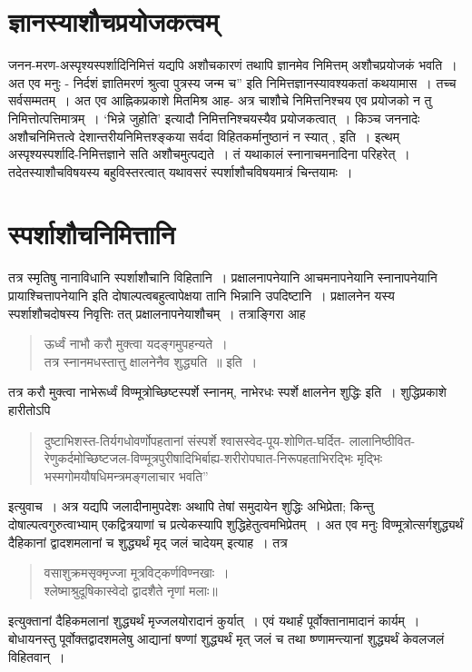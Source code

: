 {\section*{ज्ञानस्याशौचप्रयोजकत्वम्}  

जनन-मरण-अस्पृश्यस्पर्शादिनिमित्तं यद्यपि अशौचकारणं तथापि ज्ञानमेव निमित्तम् अशौचप्रयोजकं भवति~। अत एव मनुः - निर्दशं ज्ञातिमरणं श्रुत्वा पुत्रस्य जन्म च” इति निमित्तज्ञानस्यावश्यकतां कथयामास~। तच्च सर्वसम्मतम्~। अत एव आह्निकप्रकाशे मितमिश्र आह- अत्र चाशौचे निमित्तनिश्चय एव प्रयोजको न तु निमित्तोत्पत्तिमात्रम्~। ‘भिन्ने जुहोति’ इत्यादौ निमित्तनिश्चयस्यैव प्रयोजकत्वात्~। किञ्च जननादेः अशौचनिमित्तत्वे देशान्तरीयनिमित्तश्ङ्कया सर्वदा विहितकर्मानुष्ठानं न स्यात् , इति~। इत्थम् अस्पृश्यस्पर्शादि-निमित्तज्ञाने सति अशौचमुत्पद्यते~। तं यथाकालं स्नानाचमनादिना परिहरेत्~। तदेतस्याशौचविषयस्य बहुविस्तरत्वात् यथावसरं स्पर्शाशौचविषयमात्रं चिन्तयामः~। 
~\\[-1cm]
\section*{स्पर्शाशौचनिमित्तानि}

तत्र स्मृतिषु नानाविधानि स्पर्शाशौचानि विहितानि~। प्रक्षालनापनेयानि आचमनापनेयानि स्नानापनेयानि प्रायाश्चित्तापनेयानि इति दोषाल्पत्वबहुत्वापेक्षया तानि भिन्नानि उपदिष्टानि~। प्रक्षालनेन यस्य स्पर्शाशौचदोषस्य निवृत्तिः तत् प्रक्षालनापनेयाशौचम्~। तत्राङ्गिरा आह \enginline{-}
\begin{verse}
ऊर्ध्वं नाभौ करौ मुक्त्वा यदङ्गमुपहन्यते~। \\
तत्र स्नानमधस्तात्तु क्षालनेनैव शुद्ध्यति~॥ इति~। 
\end{verse}
तत्र करौ मुक्त्वा नाभेरूर्ध्वं विण्मूत्रोच्छिष्टस्पर्शे स्नानम्, नाभेरधः स्पर्शे क्षालनेन शुद्धिः इति~। शुद्धिप्रकाशे हारीतोऽपि \enginline{-} 
\begin{quote}
दुष्टाभिशस्त-तिर्यगधोवर्णोपहतानां संस्पर्शे श्वासस्वेद-पूय-शोणित-घर्दित- लालानिष्ठीवित-रेणुकर्दमोच्छिष्टजल-विण्मूत्रपुरीषादिभिर्बाह्य-शरीरोपघात-निरूपहताभिरद्भिः मृद्भिः भस्मगोमयौषधिमन्त्रमङ्गलाचार भवति” \enginline{-}
\end{quote}
इत्युवाच~। अत्र यद्यपि जलादीनामुपदेशः अथापि तेषां समुदायेन शुद्धिः अभिप्रेता; किन्तु दोषाल्पत्वगुरुत्वाभ्याम् एकद्वित्रयाणां च प्रत्येकस्यापि शुद्धिहेतुत्वमभिप्रेतम्~। अत एव मनुः विण्मूत्रोत्सर्गशुद्ध्यर्थं दैहिकानां द्वादशमलानां च शुद्ध्यर्थं मृद् जलं चादेयम् इत्याह~। तत्र 
\begin{verse}
वसाशुक्रमसृक्मृज्जा मूत्रविट्कर्णविण्नखाः~। \\
श्लेष्माश्रुदूषिकास्वेदो द्वादशैते नृणां मलाः॥
\end{verse}
इत्युक्तानां दैहिकमलानां शुद्ध्यर्थं मृज्जलयोरादानं कुर्यात्~। एवं यथार्हं पूर्वोक्तानामादानं कार्यम्~। बोधायनस्तु पूर्वोक्तद्वादशमलेषु आद्यानां षण्णां शुद्ध्यर्थं मृत् जलं च तथा ष्ण्णामन्त्यानां शुद्ध्यर्थं केवलजलं विहितवान्~। 
}
